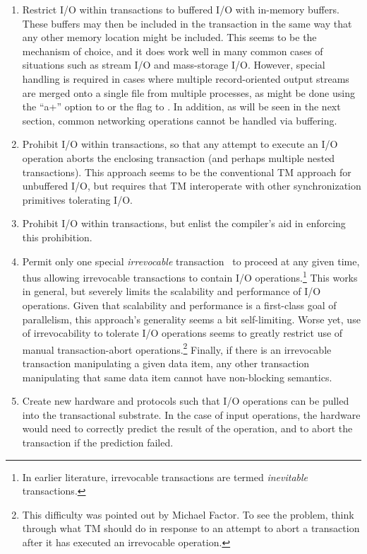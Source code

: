 \begin{enumerate}
\item	Restrict I/O within transactions to buffered I/O with in-memory
	buffers.
	These buffers may then be included in the transaction in the
	same way that any other memory location might be included.
	This seems to be the mechanism of choice, and it does work
	well in many common cases of situations such as stream I/O and
	mass-storage I/O\@.
	However, special handling is required in cases where multiple
	record-oriented output streams are merged onto a single file
	from multiple processes, as might be done using the ``a+''
	option to  or the   flag to .
	In addition, as will be seen in the next section, common
	networking operations cannot be handled via buffering.
\item	Prohibit I/O within transactions, so that any attempt to execute
	an I/O operation aborts the enclosing transaction (and perhaps
	multiple nested transactions).
	This approach seems to be the conventional TM approach for
	unbuffered I/O, but requires that TM interoperate with other
	synchronization primitives tolerating I/O.
\item	Prohibit I/O within transactions, but enlist the compiler's aid
	in enforcing this prohibition.
\item	Permit only one special
	\emph{irrevocable} transaction~\cite{SpearMichaelScott2008InevitableSTM}
	to proceed
	at any given time, thus allowing irrevocable transactions to
	contain I/O operations.\footnote{
		In earlier literature, irrevocable transactions are
		termed \emph{inevitable} transactions.}
	This works in general, but severely limits the scalability and
	performance of I/O operations.
	Given that scalability and performance is a first-class goal of
	parallelism, this approach's generality seems a bit self-limiting.
	Worse yet, use of irrevocability to tolerate I/O operations
	seems to greatly restrict use of manual transaction-abort
	operations.\footnote{
		This difficulty was pointed out by Michael Factor.
		To see the problem, think through what TM should do
		in response to an attempt to abort a transaction after
		it has executed an irrevocable operation.}
	Finally, if there is an irrevocable transaction manipulating
	a given data item, any other transaction manipulating that
	same data item cannot have non-blocking semantics.
\item	Create new hardware and protocols such that I/O operations can
	be pulled into the transactional substrate.
	In the case of input operations, the hardware would need to
	correctly predict the result of the operation, and to abort the
	transaction if the prediction failed.
\end{enumerate}

